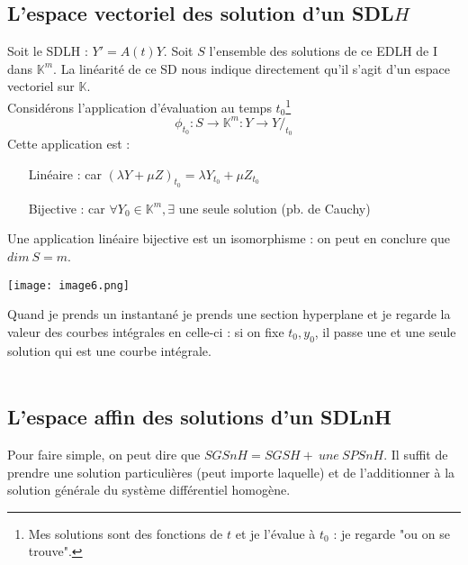 \documentclass[british,french,11pt, a4paper, openany]{book}
\begin{document}
\subsection{L'espace vectoriel des solution d'un SDL$H$}
Soit le SDLH : $Y' = A(t)Y$. Soit $S$ l'ensemble des solutions de ce EDLH de I dans $\mathbb{K}^m$. La linéarité de ce SD nous indique directement qu'il s'agit d'un espace vectoriel sur $\mathbb{K}$.\\
Considérons l'application d'évaluation au temps $t_0$\footnote{Mes solutions sont des fonctions de $t$ et je l'évalue à $t_0$ : je regarde "ou on se trouve".}
\begin{equation}
	\phi_{t_0} : S \rightarrow \mathbb{K}^m : Y \rightarrow Y/_{t_0}
\end{equation}
Cette application est :
\begin{itemize}
	\item[Linéaire :] car $(\lambda Y + \mu Z)_{t_0} = \lambda Y_{t_0} + \mu Z_{t_0}$
	\item[Bijective :] car $\forall Y_0 \in \mathbb{K}^m, \exists$ une seule solution (pb. de Cauchy)
\end{itemize}
Une application linéaire bijective est un isomorphisme : on peut en conclure que $dim\ S = m$.\\
\begin{center}
	\texttt{[image: image6.png]}
\end{center}
		
Quand je prends un instantané je prends une section hyperplane et je regarde la valeur des courbes intégrales en celle-ci : si on fixe $t_0, y_0$, il passe une et une seule solution qui est une courbe intégrale.\\
		
\ \\
		
		
\subsection{L'espace affin des solutions d'un SDLnH}
Pour faire simple, on peut dire que $SGSnH = SGSH +\ une\ SPSnH$. Il suffit de prendre une solution particulières (peut importe laquelle) et de l'additionner à la solution générale du système différentiel homogène.
		
\end{document}
